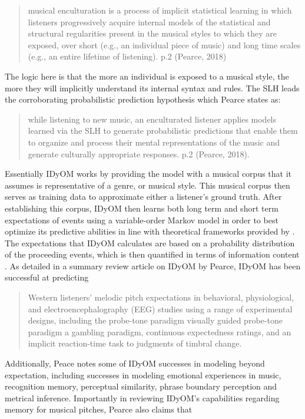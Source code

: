 \documentclass[]{book}
\begin{document}
\begin{quote}
musical enculturation is a process of implicit statistical learning in which listeners progressively acquire internal models of the statistical and structural regularities present in the musical styles to which they are exposed, over short (e.g., an individual piece of music) and long time scales (e.g., an entire lifetime of listening). p.2 (Pearce, 2018)
\end{quote}

The logic here is that the more an individual is exposed to a musical style, the more they will implicitly understand its internal syntax and rules.
The SLH leads the corroborating probabilistic prediction hypothesis which Pearce states as:

\begin{quote}
while listening to new music, an enculturated listener applies models learned via the SLH to generate probabilistic predictions that enable them to organize and process their mental representations of the music and generate culturally appropriate responses. p.2 (Pearce, 2018).
\end{quote}

Essentially IDyOM works by providing the model with a musical corpus that it assumes is representative of a genre, or musical style.
This musical corpus then serves as training data to approximate either a listener's ground truth.
After establishing this corpus, IDyOM then learns both long term and short term expectations of events using a variable-order Markov model in order to best optimize its predictive abilities in line with theoretical frameworks provided by \citet{conklinMultipleViewpointSystems1995}.
The expectations that IDyOM calculates are based on a probability distribution of the proceeding events, which is then quantified in terms of information content \citep{shannonMathematicalTheoryCommunication1948}.
As detailed in a summary review article on IDyOM by Pearce, IDyOM has been successful at predicting

\begin{quote}
Western listeners' melodic pitch expectations in behavioral,
physiological, and electroencephalography (EEG) studies using a range of experimental designs, including the probe-tone paradigm visually guided probe-tone paradigm a gambling paradigm, continuous expectedness ratings, and an implicit reaction-time task to judgments of timbral change.
\end{quote}

Additionally, Peace notes some of IDyOM successes in modeling beyond expectation, including successes in modeling emotional experiences in music, recognition memory, perceptual similarity, phrase boundary perception and metrical inference.
Importantly in reviewing IDyOM's capabilities regarding memory for musical pitches, Pearce also claims that
\end{document}
